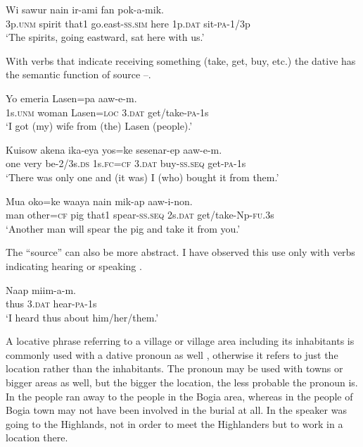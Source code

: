 \ea%
\label{ex:3:x1783}
\gll Wi sawur nain ir-ami fan  pok-a-mik.{\upshape\footnotemark} \\
3p.\textsc{unm} spirit that1 go.east-\textsc{ss}.\textsc{sim} here 1p.\textsc{dat} sit-\textsc{pa}-1/3p\\
\glt`The spirits, going eastward, sat here with us.'
\z


With verbs that indicate receiving something (take, get, buy, etc.) the dative has the semantic function of source --.

\ea%
\label{ex:3:x579}
\gll Yo emeria Lasen=pa  aaw-e-m. \\
1s.\textsc{unm} woman Lasen=\textsc{loc} 3.\textsc{dat} get/take-\textsc{pa}-1s\\
\glt`I got (my) wife from (the) Lasen (people).'
\z

\ea%
\label{ex:3:x1784}
\gll Kuisow akena ika-eya yos=ke  sesenar-ep aaw-e-m. \\
one very be-2/3s.\textsc{ds} 1s.\textsc{fc}=\textsc{cf} 3.\textsc{dat} buy-\textsc{ss}.\textsc{seq} get-\textsc{pa}-1s\\
\glt`There was only one and (it was) I (who) bought it from them.'
\z

\ea%
\label{ex:3:x1785}
\gll Mua oko=ke waaya nain mik-ap  aaw-i-non. \\
man other=\textsc{cf} pig that1 spear-\textsc{ss}.\textsc{seq} 2s.\textsc{dat} get/take-Np-\textsc{fu}.3s\\
\glt`Another man will spear the pig and take it from you.'
\z

The ``source'' can also be more abstract. I have observed this use only with verbs indicating hearing or speaking .

\ea%
\label{ex:3:x1786}
\gll Naap  miim-a-m. \\
thus 3.\textsc{dat} hear-\textsc{pa}-1s\\
\glt`I heard thus about him/her/them.'
\z

A locative phrase referring to a village or village area including its inhabitants is commonly used with a dative pronoun as well , otherwise it refers to just the location rather than the inhabitants. The pronoun may be used with towns or bigger areas as well, but the bigger the location, the less probable the pronoun is. In  the people ran away to the people in the Bogia area, whereas in  the people of Bogia town may not have been involved in the burial at all. In  the speaker was going to the Highlands, not in order to meet the Highlanders but to work in a location there. 

